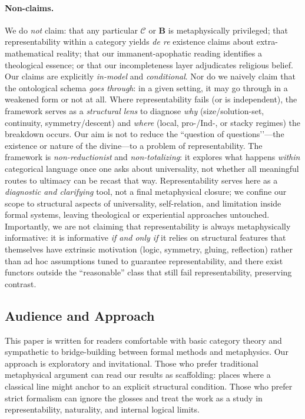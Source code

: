 \documentclass[11pt]{article}
\theoremstyle{upright}
\begin{document}
\paragraph{Non-claims.}
We do \emph{not} claim: that any particular \(\mathcal C\) or \(\mathbf B\) is metaphysically privileged; that representability within a category yields \emph{de re} existence claims about extra-mathematical reality; that our immanent-apophatic reading identifies a theological essence; or that our incompleteness layer adjudicates religious belief. Our claims are explicitly \emph{in-model} and \emph{conditional}. Nor do we naively claim that the ontological schema \emph{goes through}: in a given setting, it may go through in a weakened form or not at all. Where representability fails (or is independent), the framework serves as a \emph{structural lens} to diagnose \emph{why} (size/solution-set, continuity, symmetry/descent) and \emph{where} (local, pro-/Ind-, or stacky regimes) the breakdown occurs. Our aim is not to reduce the “question of questions’’—the existence or nature of the divine—to a problem of representability. The framework is \emph{non-reductionist} and \emph{non-totalizing}: it explores what happens \emph{within} categorical language once one asks about universality, not whether all meaningful routes to ultimacy can be recast that way. Representability serves here as a \emph{diagnostic and clarifying} tool, not a final metaphysical closure; we confine our scope to structural aspects of universality, self-relation, and limitation inside formal systems, leaving theological or experiential approaches untouched. Importantly, we are not claiming that
representability is always metaphysically informative: it is informative \emph{if and only if} it relies on structural features that themselves have extrinsic motivation (logic, symmetry, gluing, reflection) rather than ad hoc assumptions tuned to guarantee representability, and there exist functors outside the “reasonable” class that still fail representability, preserving contrast.

\subsection{Audience and Approach}
This paper is written for readers comfortable with basic category theory and sympathetic to bridge-building between formal methods and metaphysics. Our approach is exploratory and invitational. Those who prefer traditional metaphysical argument can read our results as scaffolding: places where a classical line might anchor to an explicit structural condition. Those who prefer strict formalism can ignore the glosses and treat the work as a study in representability, naturality, and internal logical limits.
\end{document}

